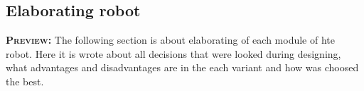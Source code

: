 \subsection{Elaborating robot }
	\textsc{\textbf{Preview:}} The following section is about elaborating of each module of hte robot. Here it is wrote about all decisions that were looked during designing, what advantages and disadvantages are in the each variant and how was choosed the best.

  
  
  
  
  